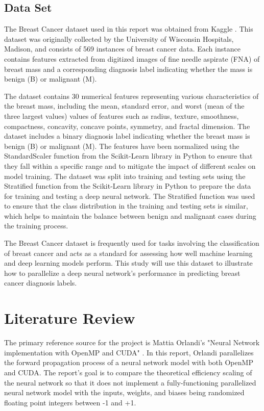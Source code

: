 \documentclass[11pt]{article}
\begin{document}
\subsection{Data Set}
The Breast Cancer dataset used in this report was obtained from Kaggle \cite{dataset}. This dataset was originally collected by the University of Wisconsin Hospitals, Madison, and consists of 569 instances of breast cancer data. Each instance contains features extracted from digitized images of fine needle aspirate (FNA) of breast mass and a corresponding diagnosis label indicating whether the mass is benign (B) or malignant (M). 

\bigskip

The dataset contains 30 numerical features representing various characteristics of the breast mass, including the mean, standard error, and worst (mean of the three largest values) values of features such as radius, texture, smoothness, compactness, concavity, concave points, symmetry, and fractal dimension. The dataset includes a binary diagnosis label indicating whether the breast mass is benign (B) or malignant (M). The features have been normalized using the StandardScaler function from the Scikit-Learn library in Python to ensure that they fall within a specific range and to mitigate the impact of different scales on model training. The dataset was split into training and testing sets using the Stratified function from the Scikit-Learn library in Python to prepare the data for training and testing a deep neural network. The Stratified function was used to ensure that the class distribution in the training and testing sets is similar, which helps to maintain the balance between benign and malignant cases during the training process.

\bigskip

The Breast Cancer dataset is frequently used for tasks involving the classification of breast cancer and acts as a standard for assessing how well machine learning and deep learning models perform. This study will use this dataset to illustrate how to parallelize a deep neural network's performance in predicting breast cancer diagnosis labels.

\clearpage


\section{Literature Review}
The primary reference source for the project is Mattia Orlandi's "Neural Network implementation with OpenMP and CUDA" \cite{Orlandi}. In this report, Orlandi parallelizes the forward propagation process of a neural network model with both OpenMP and CUDA. The report's goal is to compare the theoretical efficiency scaling of the neural network so that it does not implement a fully-functioning parallelized neural network model with the inputs, weights, and biases being randomized floating point integers between -1 and +1. 
\end{document}
